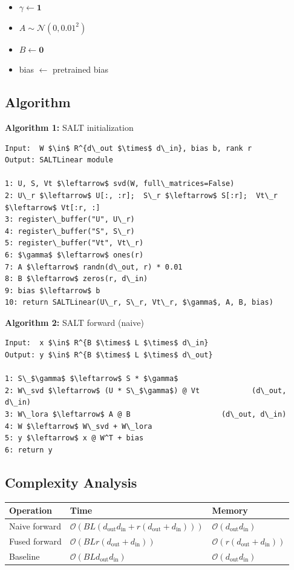 \begin{itemize}
\item $\gamma \leftarrow \mathbf{1}$
\item $A \sim \mathcal{N}(0, 0.01^2)$
\item $B \leftarrow \mathbf{0}$
\item bias $\leftarrow$ pretrained bias

\end{itemize}
\subsection{Algorithm}

\textbf{Algorithm 1:} SALT initialization
\begin{lstlisting}
Input:  W $\in$ R^{d\_out $\times$ d\_in}, bias b, rank r
Output: SALTLinear module

1: U, S, Vt $\leftarrow$ svd(W, full\_matrices=False)
2: U\_r $\leftarrow$ U[:, :r];  S\_r $\leftarrow$ S[:r];  Vt\_r $\leftarrow$ Vt[:r, :]
3: register\_buffer("U", U\_r)
4: register\_buffer("S", S\_r)
5: register\_buffer("Vt", Vt\_r)
6: $\gamma$ $\leftarrow$ ones(r)
7: A $\leftarrow$ randn(d\_out, r) * 0.01
8: B $\leftarrow$ zeros(r, d\_in)
9: bias $\leftarrow$ b
10: return SALTLinear(U\_r, S\_r, Vt\_r, $\gamma$, A, B, bias)
\end{lstlisting}

\textbf{Algorithm 2:} SALT forward (naive)
\begin{lstlisting}
Input:  x $\in$ R^{B $\times$ L $\times$ d\_in}
Output: y $\in$ R^{B $\times$ L $\times$ d\_out}

1: S\_$\gamma$ $\leftarrow$ S * $\gamma$
2: W\_svd $\leftarrow$ (U * S\_$\gamma$) @ Vt            (d\_out, d\_in)
3: W\_lora $\leftarrow$ A @ B                     (d\_out, d\_in)
4: W $\leftarrow$ W\_svd + W\_lora
5: y $\leftarrow$ x @ W^T + bias
6: return y
\end{lstlisting}

\subsection{Complexity Analysis}

\begin{table}[H]
\centering
\small
\begin{tabular}{lll}
\toprule
\textbf{Operation} & \textbf{Time} & \textbf{Memory} \\
\midrule
Naive forward & $\mathcal{O}(BL(d_\text{out} d_\text{in} + r(d_\text{out} + d_\text{in})))$ & $\mathcal{O}(d_\text{out} d_\text{in})$ \\
Fused forward & $\mathcal{O}(BL r (d_\text{out} + d_\text{in}))$ & $\mathcal{O}(r(d_\text{out} + d_\text{in}))$ \\
Baseline & $\mathcal{O}(BL d_\text{out} d_\text{in})$ & $\mathcal{O}(d_\text{out} d_\text{in})$ \\
\bottomrule
\end{tabular}
\end{table}

